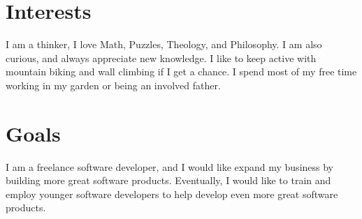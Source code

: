\documentclass[a4paper]{twentysecondcv} %
\begin{document}




\makeprofile %


\section{Interests}

I am a thinker, I love Math, Puzzles, Theology, and Philosophy. I am also curious, and always appreciate new knowledge.
I like to keep active with mountain biking and wall climbing if I get a chance.
I spend most of my free time working in my garden or being an involved father.


\section{Goals}

I am a freelance software developer, and I would like expand my business by building more great software products.
Eventually, I would like to train and employ younger software developers to help develop even more great software products.
\end{document}
